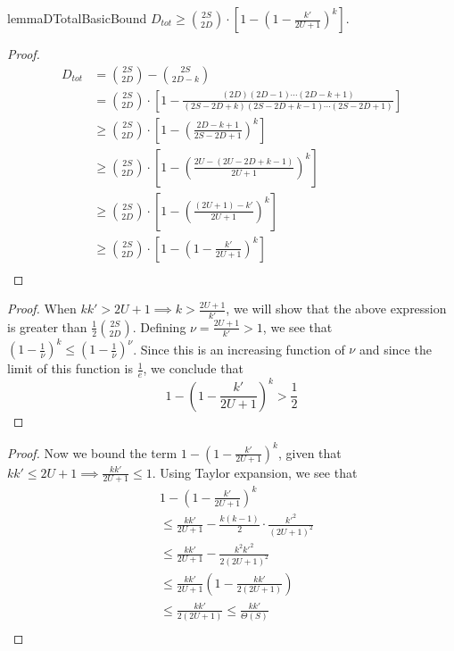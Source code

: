 \begin{restatable}{lemma}{DTotalBasicBound}
\label{lem:DTotalBasicBound}
$D_{tot} \ge {{2S}\choose{2D}}\cdot \left[1-\left(1 - \frac{k'}{2U+1}\right)^k\right]$.
\end{restatable}
\begin{proof}
\begin{align}
D_{tot} &= {{2S}\choose{2D}}-{{2S}\choose{2D-k}}\\
&= {{2S}\choose{2D}}\cdot \left[1-\frac{(2D)(2D-1)\cdots(2D-k+1)}{(2S-2D+k)(2S-2D+k-1)\cdots(2S-2D+1)}\right]\\
&\ge {{2S}\choose{2D}}\cdot \left[1-\left(\frac{2D-k+1}{2S-2D+1}\right)^k\right]\\
&\ge {{2S}\choose{2D}}\cdot \left[1-\left(\frac{2U-(2U-2D+k-1)}{2U+1}\right)^k\right]\\
&\ge {{2S}\choose{2D}}\cdot \left[1-\left(\frac{(2U+1)-k'}{2U+1}\right)^k\right]\\
&\ge {{2S}\choose{2D}}\cdot \left[1-\left(1 - \frac{k'}{2U+1}\right)^k\right]\\
\end{align}
\end{proof}


\DTotalFarBoundary*
\begin{proof}
When $kk' > 2U + 1 \implies k > \frac{2U+1}{k'}$,
we will show that the above expression is greater than $\frac 12 \binom{2S}{2D}$.
Defining $\nu = \frac{2U+1}{k'} > 1$, we see that $(1-\frac 1\nu)^k \le (1-\frac 1\nu)^\nu$.
Since this is an increasing function of $\nu$ and since the limit of this function is $\frac 1e$,
we conclude that
\[
1-\left(1 - \frac{k'}{2U+1}\right)^k > \frac 12
\]
\end{proof}

\DTotalNearBoundary*
\begin{proof}
Now we bound the term $1-\left(1-\frac{k'}{2U+1}\right)^k$, given that $kk'\le 2U+1\implies\frac{kk'}{2U+1} \le 1$.
Using Taylor expansion, we see that
\begin{align}
&1 - \left(1 - \frac{k'}{2U+1}\right)^k\\
&\le \frac{kk'}{2U+1} - \frac{k(k-1)}{2}\cdot\frac{k'^2}{(2U+1)^2}\\
&\le \frac{kk'}{2U+1} - \frac{k^2k'^2}{2(2U+1)^2}\\
&\le \frac{kk'}{2U+1} \left(1 - \frac{kk'}{2(2U+1)}\right)\\
&\le \frac{kk'}{2(2U+1)} \le \frac{kk'}{\Theta(S)}\\
\end{align}
\end{proof}
